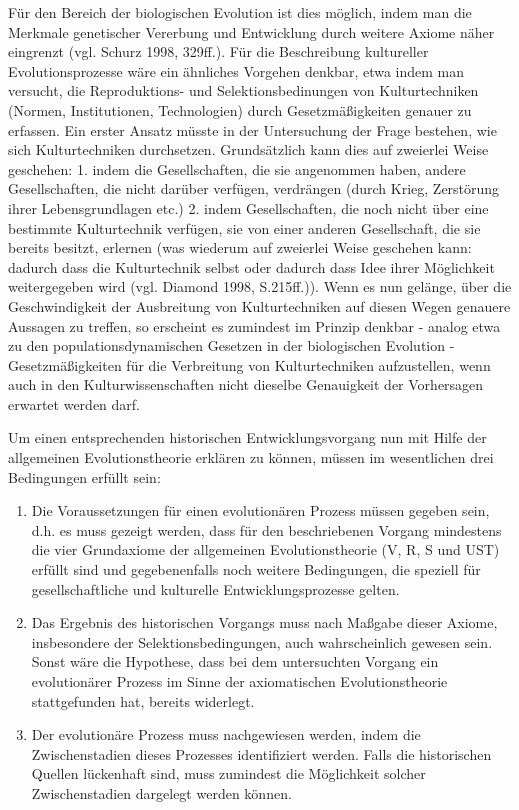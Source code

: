 \documentclass[12pt,a4paper,ngerman]{article}
\begin{document}
Für den Bereich der biologischen Evolution ist dies möglich, indem man
die Merkmale genetischer Vererbung und Entwicklung durch weitere
Axiome näher eingrenzt (vgl. Schurz 1998, 329ff.). Für die
Beschreibung kultureller Evolutionsprozesse wäre ein ähnliches
Vorgehen denkbar, etwa indem man versucht, die Reproduktions- und
Selektionsbedinungen von Kulturtechniken (Normen, Institutionen,
Technologien) durch Gesetzmäßigkeiten genauer zu erfassen. Ein erster
Ansatz müsste in der Untersuchung der Frage bestehen, wie sich
Kulturtechniken durchsetzen. Grundsätzlich kann dies auf zweierlei
Weise geschehen: 1. indem die Gesellschaften, die sie angenommen
haben, andere Gesellschaften, die nicht darüber verfügen, verdrängen
(durch Krieg, Zerstörung ihrer Lebensgrundlagen etc.)  2. indem
Gesellschaften, die noch nicht über eine bestimmte Kulturtechnik
verfügen, sie von einer anderen Gesellschaft, die sie bereits besitzt,
erlernen (was wiederum auf zweierlei Weise geschehen kann: dadurch
dass die Kulturtechnik selbst oder dadurch dass Idee ihrer Möglichkeit
weitergegeben wird (vgl. Diamond 1998, S.215ff.)). Wenn es nun
gelänge, über die Geschwindigkeit der Ausbreitung von Kulturtechniken
auf diesen Wegen genauere Aussagen zu treffen, so erscheint es
zumindest im Prinzip denkbar - analog etwa zu den
populationsdynamischen Gesetzen in der biologischen Evolution -
Gesetzmäßigkeiten für die Verbreitung von Kulturtechniken
aufzustellen, wenn auch in den Kulturwissenschaften nicht dieselbe
Genauigkeit der Vorhersagen erwartet werden darf.

Um einen entsprechenden historischen Entwicklungsvorgang nun mit Hilfe der allgemeinen
Evolutionstheorie erklären zu können, müssen im wesentlichen drei
Bedingungen erfüllt sein:

\begin{enumerate}

\item Die Voraussetzungen für einen evolutionären Prozess müssen gegeben
  sein, d.h. es muss gezeigt werden, dass für den beschriebenen
  Vorgang mindestens die vier Grundaxiome der allgemeinen
  Evolutionstheorie (V, R, S und UST) erfüllt sind und gegebenenfalls
  noch weitere Bedingungen, die speziell für gesellschaftliche und
  kulturelle Entwicklungsprozesse gelten.

\item Das Ergebnis des historischen Vorgangs muss nach Maßgabe dieser Axiome,
  insbesondere der Selektionsbedingungen, auch wahrscheinlich gewesen
  sein. Sonst wäre die Hypothese, dass bei dem untersuchten Vorgang ein
  evolutionärer Prozess im Sinne der axiomatischen Evolutionstheorie
  stattgefunden hat, bereits widerlegt.

\item Der evolutionäre Prozess muss nachgewiesen werden, indem die
  Zwischenstadien dieses Prozesses identifiziert werden. Falls die
  historischen Quellen lückenhaft sind, muss zumindest die Möglichkeit solcher
  Zwischenstadien dargelegt werden können.

\end{enumerate}
\end{document}
